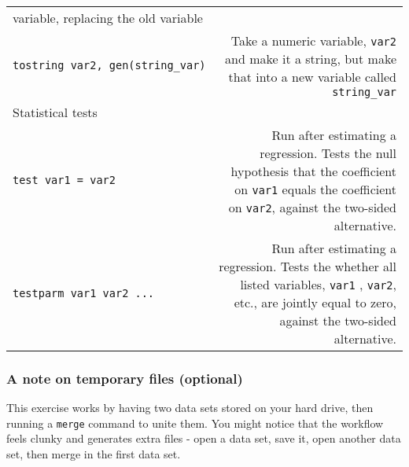 \documentclass[
]{article}
\begin{document}
\begin{longtable}[]{@{}lr@{}}
\begin{minipage}[t]{0.41\columnwidth}
variable, replacing the old variable\strut
\end{minipage}\tabularnewline
\begin{minipage}[t]{0.53\columnwidth}\raggedright
\texttt{tostring\ var2,\ gen(string\_var)}\strut
\end{minipage} & \begin{minipage}[t]{0.41\columnwidth}\raggedleft
Take a numeric variable, \texttt{var2} and make it a string, but make
that into a new variable called \texttt{string\_var}\strut
\end{minipage}\tabularnewline
\begin{minipage}[t]{0.53\columnwidth}\raggedright
Statistical tests\strut
\end{minipage} & \begin{minipage}[t]{0.41\columnwidth}\raggedleft
\strut
\end{minipage}\tabularnewline
\begin{minipage}[t]{0.53\columnwidth}\raggedright
\texttt{test\ var1\ =\ var2}\strut
\end{minipage} & \begin{minipage}[t]{0.41\columnwidth}\raggedleft
Run after estimating a regression. Tests the null hypothesis that the
coefficient on \texttt{var1} equals the coefficient on \texttt{var2},
against the two-sided alternative.\strut
\end{minipage}\tabularnewline
\begin{minipage}[t]{0.53\columnwidth}\raggedright
\texttt{testparm\ var1\ var2\ ...}\strut
\end{minipage} & \begin{minipage}[t]{0.41\columnwidth}\raggedleft
Run after estimating a regression. Tests the whether all listed
variables, \texttt{var1} , \texttt{var2}, etc., are jointly equal to
zero, against the two-sided alternative.\strut
\end{minipage}\tabularnewline
\bottomrule
\end{longtable}

\hypertarget{a-note-on-temporary-files-optional}{%
\subsubsection{A note on temporary files
(optional)}\label{a-note-on-temporary-files-optional}}

This exercise works by having two data sets stored on your hard drive,
then running a \texttt{merge} command to unite them. You might notice
that the workflow feels clunky and generates extra files - open a data
set, save it, open another data set, then merge in the first data set.
\end{document}
